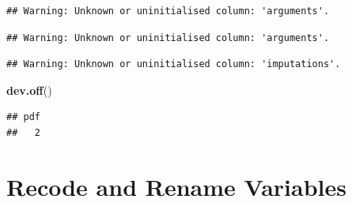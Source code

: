 \documentclass[
]{article}
\newenvironment{Shaded}{\begin{snugshade}}{\end{snugshade}}
\newcommand{\KeywordTok}[1]{\textcolor[rgb]{0.13,0.29,0.53}{\textbf{#1}}}
\newcommand{\NormalTok}[1]{#1}
\begin{document}
\begin{verbatim}
## Warning: Unknown or uninitialised column: 'arguments'.
\end{verbatim}

\begin{verbatim}
## Warning: Unknown or uninitialised column: 'arguments'.
\end{verbatim}

\begin{verbatim}
## Warning: Unknown or uninitialised column: 'imputations'.
\end{verbatim}

\begin{Shaded}
\begin{Highlighting}[]
\KeywordTok{dev.off}\NormalTok{()}
\end{Highlighting}
\end{Shaded}

\begin{verbatim}
## pdf 
##   2
\end{verbatim}

\hypertarget{recode-and-rename-variables}{%
\section{Recode and Rename
Variables}\label{recode-and-rename-variables}}
\end{document}
